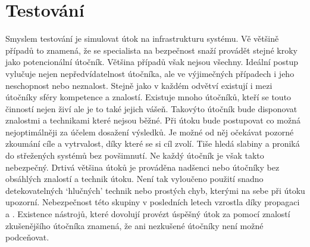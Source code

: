 \section{Testování}
Smyslem testování je simulovat útok na infrastrukturu systému.
Vě většině případů to znamená, že se specialista na bezpečnost snaží provádět stejné kroky jako potencionální útočník.
Většina případů však nejsou všechny.
Ideální postup vylučuje nejen nepředvídatelnost útočníka, ale ve výjimečných případech i jeho neschopnost nebo neznalost.
Stejně jako v každém odvětví existují i mezi útočníky sféry kompetence a znalostí.
Existuje mnoho útočníků, kteří se touto činností nejen živí ale je to také jejich vášeň.
Takovýto útočník bude disponovat znalostmi a technikami které nejsou běžné.
Při útoku bude postupovat co možná nejoptimálněji za účelem dosažení výsledků.
Je možné od něj očekávat pozorné zkoumání cíle a vytrvalost, díky které se si cíl zvolí.
Tiše hledá slabiny a proniká do střežených systémů bez povšimnutí.
Ne každý útočník je však takto nebezpečný.
Drtivá většina útoků je prováděna nadšenci nebo útočníky bez obsáhlých znalostí a technik útoku.
Není tak vyloučeno použití snadno detekovatelných `hlučných' technik nebo prostých chyb, kterými na sebe při útoku upozorní.
Nebezpečnost této skupiny v posledních letech vzrostla díky propagaci \cite{MaaS_ATaT} a \cite{RaaS_microsoft}.
Existence nástrojů, které dovolují provézt úspěšný útok za pomocí znalostí zkušenějšího útočníka znamená, že ani nezkušené útočníky není možné podceňovat.

